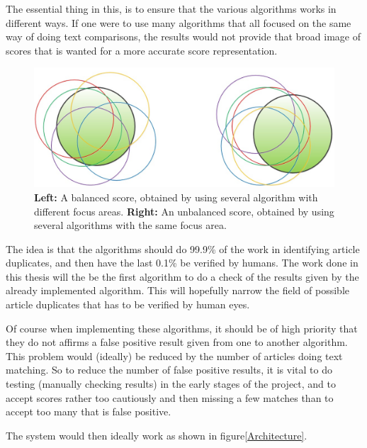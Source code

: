 The essential thing in this, is to ensure that the various algorithms works in different ways. If one were to use many algorithms that all focused on the same way of doing text comparisons, the results would not provide that broad image of scores that is wanted for a more accurate score representation.

\begin{figure}
	\centering
	\includegraphics[scale=0.3]{figures/MultipleAlgoScores}
	\caption{\textbf{Left:} A balanced score, obtained by using several algorithm with different focus areas. \textbf{Right:} An unbalanced score, obtained by using several algorithms with the same focus area\cite{Slides}.}
	\label{MultipleAlgo}
\end{figure}

The idea is that the algorithms should do 99.9\% of the work in identifying article duplicates, and then have the  last 0.1\% be verified by humans. The work done in this thesis will the be the first algorithm to do a check of the results given by the already implemented algorithm. This will hopefully narrow the field of possible article duplicates that has to be verified by human eyes.

Of course when implementing these algorithms, it should be of high priority that they do not affirms a false positive result given from one to another algorithm. This problem would (ideally) be reduced by the number of articles doing text matching. So to reduce the number of false positive results, it is vital to do testing (manually checking results) in the early stages of the project, and to accept scores rather too cautiously and then missing a few matches than to accept too many that is false positive.

The system would then ideally work as shown in figure\ref{Architecture}.


